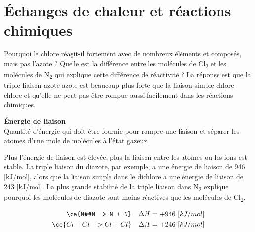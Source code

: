 \documentclass[
  11pt,
  a4paper,
  openany]{book}
\begin{document}
\hypertarget{uxe9changes-de-chaleur-et-ruxe9actions-chimiques}{%
\section{Échanges de chaleur et réactions chimiques}\label{uxe9changes-de-chaleur-et-ruxe9actions-chimiques}}

Pourquoi le chlore réagit-il fortement avec de nombreux éléments et composés, mais pas l'azote ? Quelle est la différence entre les molécules de Cl\textsubscript{2} et les molécules de N\textsubscript{2} qui explique cette différence de réactivité ? La réponse est que la triple liaison azote-azote est beaucoup plus forte que la liaison simple chlore-chlore et qu'elle ne peut pas être rompue aussi facilement dans les réactions chimiques.

\begin{tcolorbox}
\textbf{Énergie de liaison}\\
Quantité d'énergie qui doit être fournie pour rompre une liaison et séparer les atomes d'une mole de molécules à l'état gazeux.

\end{tcolorbox}

Plus l'énergie de liaison est élevée, plus la liaison entre les atomes ou les ions est stable. La triple liaison du diazote, par exemple, a une énergie de liaison de 946 {[}kJ/mol{]}, alors que la liaison simple dans le dichlore a une énergie de liaison de 243 {[}kJ/mol{]}. La plus grande stabilité de la triple liaison dans N\textsubscript{2} explique pourquoi les molécules de diazote sont moins réactives que les molécules de Cl\textsubscript{2}.

\[
\begin{split}
\ce{N#N -> N + N} \quad \Delta H = +946\ [kJ/mol] \\ 
\ce{Cl-Cl -> Cl + Cl} \quad \Delta H = +246\ [kJ/mol]
\end{split}
\]
\end{document}
